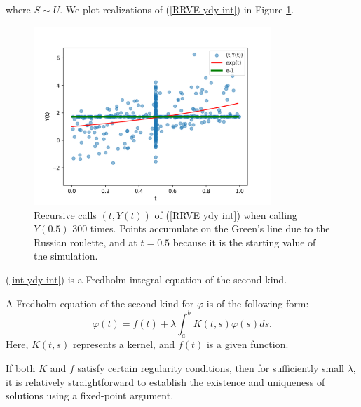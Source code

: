 \documentclass[a4paper,12pt]{article}
\begin{document}
\begin{example}[$y_t=y$ average condition]
    where $S \sim U$. We plot realizations of
    (\ref{RRVE ydy int}) in Figure \ref{fig:ydy int}.

    \begin{figure}[h!]
        \centering
        \includegraphics[width=0.8\textwidth]{plots/ydy int.png}
        \caption{Recursive calls $(t,Y(t))$ of (\ref{RRVE ydy int}) when
            calling $Y(0.5)$ $300$ times. Points accumulate on
            the Green's line due to the Russian roulette,
            and at  $t=0.5$ because it is the starting
            value of the simulation.
        }
        \label{fig:ydy int}
    \end{figure}

\end{example}

(\ref{int ydy int}) is a Fredholm integral
equation of the second kind.

\begin{definition}
    A Fredholm equation of the second kind for $\varphi$  is of the following form:
    \begin{equation}
        \varphi(t)=f(t)+\lambda \int_a^b K(t, s) \varphi(s) ds.
    \end{equation}
    Here, $K(t, s)$ represents a kernel, and $f(t)$ is a given function.
\end{definition}

If both $K$ and $f$ satisfy certain regularity conditions, then for sufficiently
small $\lambda$, it is relatively straightforward to establish the existence
and uniqueness of solutions using a fixed-point argument.
\end{document}
